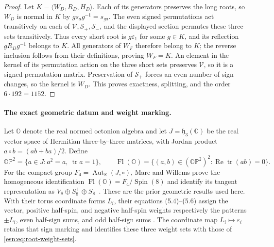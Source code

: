 \begin{proof}
Let \(K=\langle W_D,R_D,H_D\rangle\).  Each of its generators
preserves the long roots, so \(W_D\) is normal in \(K\) by
\(g s_a g^{-1}=s_{ga}\).  The even signed permutations act
transitively on each of \(\mathcal V,\mathcal S_+,\mathcal S_-\),
and the displayed section permutes these three sets transitively.
Thus every short root is \(g\varepsilon_1\) for some \(g\in K\),
and its reflection \(gR_Dg^{-1}\) belongs to \(K\).  All generators
of \(W_F\) therefore belong to \(K\); the reverse inclusion follows
from their definitions, proving \(W_F=K\).
An element in the kernel of its permutation action on the three short
sets preserves \(\mathcal V\), so it is a signed permutation matrix.
Preservation of \(\mathcal S_+\) forces an even number of sign
changes, so the kernel is \(W_D\).  This proves exactness, splitting,
and the order \(6\cdot192=1152\).
\end{proof}

\paragraph{The exact geometric datum and weight marking.}
Let \(\mathbb O\) denote the real normed octonion algebra and let
\(J=\mathfrak h_3(\mathbb O)\) be the real vector space of Hermitian
three-by-three matrices, with Jordan product
\(a\circ b=(ab+ba)/2\).  Define
\[
 \mathbb O\mathbb P^2=\{a\in J:a^2=a,\ \operatorname{tr}a=1\},
 \qquad
 \operatorname{Fl}(\mathbb O)=
 \{(a,b)\in(\mathbb O\mathbb P^2)^2:
                                 \operatorname{Re}\operatorname{tr}(ab)=0\}.
\]
For the compact group \(F_4=\operatorname{Aut}_{\mathbb R}(J,\circ)\),
Mare and Willems prove the homogeneous identification
\(\operatorname{Fl}(\mathbb O)=F_4/\operatorname{Spin}(8)\) and
identify its tangent representation as
\(V_8\oplus S_8^+\oplus S_8^-\)
\cite[Definition~2.2, Proposition~2.4, Proposition~2.7, and
pp.~491--492]{esn:MareWillems2013}.  These are the prior geometric
results used here.  With their torus coordinate forms \(L_i\), their
equations (5.4)--(5.6) assign the vector, positive half-spin, and negative
half-spin weights respectively the patterns
\(\pm L_i\), even half-sign sums, and odd half-sign sums
\cite[pp.~510--511]{esn:MareWillems2013}.
The coordinate map \(L_i\mapsto\varepsilon_i\) retains that sign
marking and identifies these three weight sets with those of
\eqref{esn:eq:root-weight-sets}.

